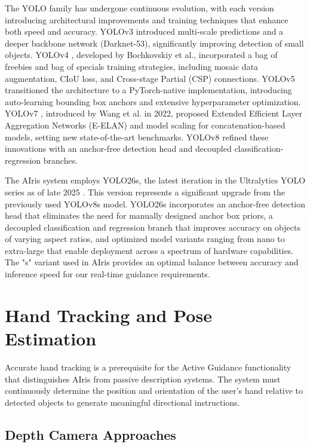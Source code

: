 \documentclass[12pt,a4paper]{report}
\begin{document}
The YOLO family has undergone continuous evolution, with each version introducing architectural improvements and training techniques that enhance both speed and accuracy. YOLOv3 \cite{yolov3} introduced multi-scale predictions and a deeper backbone network (Darknet-53), significantly improving detection of small objects. YOLOv4 \cite{yolov4}, developed by Bochkovskiy et al., incorporated a bag of freebies and bag of specials training strategies, including mosaic data augmentation, CIoU loss, and Cross-stage Partial (CSP) connections. YOLOv5 \cite{yolov5} transitioned the architecture to a PyTorch-native implementation, introducing auto-learning bounding box anchors and extensive hyperparameter optimization. YOLOv7 \cite{yolov7}, introduced by Wang et al. in 2022, proposed Extended Efficient Layer Aggregation Networks (E-ELAN) and model scaling for concatenation-based models, setting new state-of-the-art benchmarks. YOLOv8 \cite{yolov8} refined these innovations with an anchor-free detection head and decoupled classification-regression branches.

The AIris system employs YOLO26s, the latest iteration in the Ultralytics YOLO series as of late 2025 \cite{yolo26}. This version represents a significant upgrade from the previously used YOLOv8s model. YOLO26s incorporates an anchor-free detection head that eliminates the need for manually designed anchor box priors, a decoupled classification and regression branch that improves accuracy on objects of varying aspect ratios, and optimized model variants ranging from nano to extra-large that enable deployment across a spectrum of hardware capabilities. The "s" variant used in AIris provides an optimal balance between accuracy and inference speed for our real-time guidance requirements.

\section{Hand Tracking and Pose Estimation}

Accurate hand tracking is a prerequisite for the Active Guidance functionality that distinguishes AIris from passive description systems. The system must continuously determine the position and orientation of the user's hand relative to detected objects to generate meaningful directional instructions.

\subsection{Depth Camera Approaches}
\end{document}
